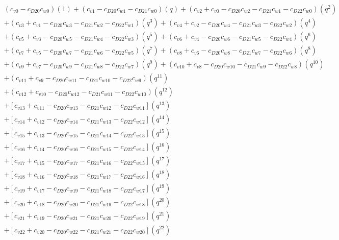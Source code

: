 \documentclass[12pt]{article}
\begin{document}
\begin{align}
    &(c_{v0}-c_{D20}c_{w0})(1) + (c_{v1}- c_{D20}c_{w1} - c_{D21}c_{w0})(q) + (c_{v2} + c_{v0} - c_{D20}c_{w2} - c_{D21}c_{w1} - c_{D22}c_{w0})(q^2) \nonumber\\
    &+ (c_{v3} + c_{v1} - c_{D20}c_{w3} - c_{D21}c_{w2} - c_{D22}c_{w1})(q^3) + (c_{v4} + c_{v2} - c_{D20}c_{w4} - c_{D21}c_{w3} - c_{D22}c_{w2})(q^4) \nonumber\\
    &+ (c_{v5} + c_{v3} - c_{D20}c_{w5} - c_{D21}c_{w4} - c_{D22}c_{w3})(q^5) + (c_{v6} + c_{v4} - c_{D20}c_{w6} - c_{D21}c_{w5} - c_{D22}c_{w4})(q^6) \nonumber\\
    &+ (c_{v7} + c_{v5} - c_{D20}c_{w7} - c_{D21}c_{w6} - c_{D22}c_{w5})(q^7) + (c_{v8} + c_{v6} - c_{D20}c_{w8} - c_{D21}c_{w7} - c_{D22}c_{w6})(q^8) \nonumber\\
    &+ (c_{v9} + c_{v7} - c_{D20}c_{w9} - c_{D21}c_{w8} - c_{D22}c_{w7})(q^9) + (c_{v10} + c_{v8} - c_{D20}c_{w10} - c_{D21}c_{w9} - c_{D22}c_{w8})(q^{10}) \nonumber\\
    &+ (c_{v11} + c_{v9} - c_{D20}c_{w11} - c_{D21}c_{w10} - c_{D22}c_{w9})(q^{11}) \nonumber\\
    &+ (c_{v12} + c_{v10} - c_{D20}c_{w12} - c_{D21}c_{w11} - c_{D22}c_{w10})(q^{12}) \nonumber\\
    &+ [c_{v13} + c_{v11} - c_{D20}c_{w13} - c_{D21}c_{w12} - c_{D22}c_{w11}](q^{13}) \nonumber\\
    &+ [c_{v14} + c_{v12} - c_{D20}c_{w14} - c_{D21}c_{w13} - c_{D22}c_{w12}](q^{14}) \nonumber\\
    &+ [c_{v15} + c_{v13} - c_{D20}c_{w15} - c_{D21}c_{w14} - c_{D22}c_{w13}](q^{15}) \nonumber\\
    &+ [c_{v16} + c_{v14} - c_{D20}c_{w16} - c_{D21}c_{w15} - c_{D22}c_{w14}](q^{16}) \nonumber\\
    &+ [c_{v17} + c_{v15} - c_{D20}c_{w17} - c_{D21}c_{w16} - c_{D22}c_{w15}](q^{17}) \nonumber\\
    &+ [c_{v18} + c_{v16} - c_{D20}c_{w18} - c_{D21}c_{w17} - c_{D22}c_{w16}](q^{18}) \nonumber\\
    &+ [c_{v19} + c_{v17} - c_{D20}c_{w19} - c_{D21}c_{w18} - c_{D22}c_{w17}](q^{19}) \nonumber\\
    &+ [c_{v20} + c_{v18} - c_{D20}c_{w20} - c_{D21}c_{w19} - c_{D22}c_{w18}](q^{20}) \nonumber\\
    &+ [c_{v21} + c_{v19} - c_{D20}c_{w21} - c_{D21}c_{w20} - c_{D22}c_{w19}](q^{21}) \nonumber\\
    &+ [c_{v22} + c_{v20} - c_{D20}c_{w22} - c_{D21}c_{w21} - c_{D22}c_{w20}](q^{22}) \nonumber\\

\end{align}
\end{document}
